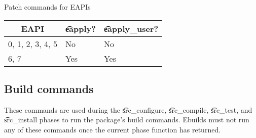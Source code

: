 \begin{centertable}{Patch commands for EAPIs}
    \label{tab:patch-commands}
    \begin{tabular}{lll}
      \toprule
      \multicolumn{1}{c}{\textbf{EAPI}} &
      \multicolumn{1}{c}{\textbf{\t{eapply}?}} &
      \multicolumn{1}{c}{\textbf{\t{eapply_user}?}} \\
      \midrule
      0, 1, 2, 3, 4, 5  & No  & No  \\
      6, 7              & Yes & Yes \\
      \bottomrule
    \end{tabular}
\end{centertable}

\subsection{Build commands}
These commands are used during the \t{src_configure}, \t{src_compile}, \t{src_test},
and \t{src_install} phases to run the package's build commands. Ebuilds must not run any of these
commands once the current phase function has returned.

